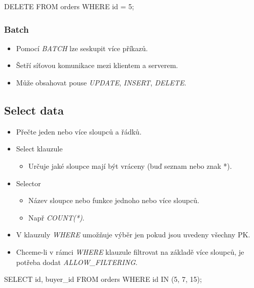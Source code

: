 \documentclass{article}
\begin{document}
        \begin{listings}[language=cql]
          DELETE FROM orders
          WHERE id = 5;
        \end{listings}

      \subsubsection{Batch}
        \begin{itemize}
          \item Pomocí \emph{BATCH} lze seskupit více příkazů.
          \item Šetří síťovou komunikace mezi klientem a serverem.
          \item Může obsahovat pouse \emph{UPDATE}, \emph{INSERT}, \emph{DELETE}.
        \end{itemize}

      \subsection{Select data}
        \begin{itemize}
          \item Přečte jeden nebo více sloupců a řádků.
          \item Select klauzule
            \begin{itemize}
              \item Určuje jaké sloupce mají být vráceny (buď seznam nebo znak *).
            \end{itemize}
          \item Selector
            \begin{itemize}
              \item Název sloupce nebo funkce jednoho nebo více sloupců.
              \item Např \emph{COUNT(*)}.
            \end{itemize}
          \item V klauzuly \emph{WHERE} umožňuje výběr jen pokud jsou uvedeny všechny PK.
          \item Chceme-li v rámci \emph{WHERE} klauzule filtrovat na základě více sloupců, je potřeba dodat \emph{ALLOW_FILTERING}.
        \end{itemize}

        \begin{listings}[language=cql]
          SELECT id, buyer_id
          FROM orders
          WHERE id IN (5, 7, 15);
        \end{listings}
\end{document}
